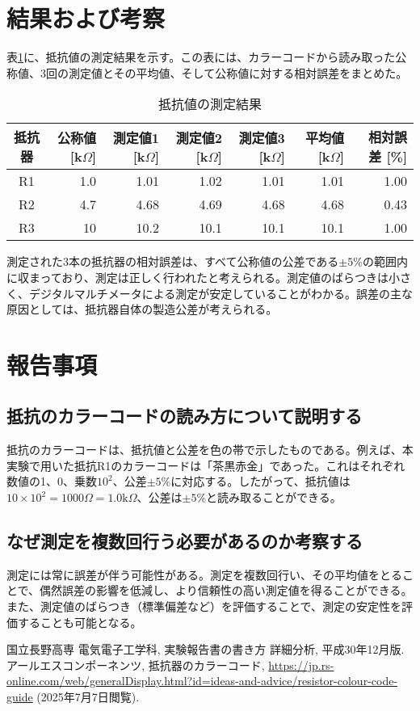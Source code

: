 \documentclass{ltjarticle}
\begin{document}
\section{結果および考察}
表\ref{tab:results}に、抵抗値の測定結果を示す。この表には、カラーコードから読み取った公称値、3回の測定値とその平均値、そして公称値に対する相対誤差をまとめた。

\begin{table}[h]
    \centering
    \caption{抵抗値の測定結果}
    \label{tab:results}
    \begin{tabular}{crrrrrr}
        \toprule
        抵抗器 & 公称値 [k$\Omega$] & 測定値1 [k$\Omega$] & 測定値2 [k$\Omega$] & 測定値3 [k$\Omega$] & 平均値 [k$\Omega$] & 相対誤差 [\%] \\
        \midrule
        R1 & 1.0 & 1.01 & 1.02 & 1.01 & 1.01 & 1.00 \\
        R2 & 4.7 & 4.68 & 4.69 & 4.68 & 4.68 & 0.43 \\
        R3 & 10 & 10.2 & 10.1 & 10.1 & 10.1 & 1.00 \\
        \bottomrule
    \end{tabular}
\end{table}

測定された3本の抵抗器の相対誤差は、すべて公称値の公差である$\pm 5\%$の範囲内に収まっており、測定は正しく行われたと考えられる。測定値のばらつきは小さく、デジタルマルチメータによる測定が安定していることがわかる。誤差の主な原因としては、抵抗器自体の製造公差が考えられる。

\section{報告事項}
\subsection{抵抗のカラーコードの読み方について説明する}
抵抗のカラーコードは、抵抗値と公差を色の帯で示したものである。例えば、本実験で用いた抵抗R1のカラーコードは「茶黒赤金」であった。これはそれぞれ数値の1、0、乗数$10^2$、公差$\pm 5\%$に対応する。したがって、抵抗値は $10 \times 10^2 = 1000\Omega = 1.0\text{k}\Omega$、公差は$\pm 5\%$と読み取ることができる。

\subsection{なぜ測定を複数回行う必要があるのか考察する}
測定には常に誤差が伴う可能性がある。測定を複数回行い、その平均値をとることで、偶然誤差の影響を低減し、より信頼性の高い測定値を得ることができる。また、測定値のばらつき（標準偏差など）を評価することで、測定の安定性を評価することも可能となる。

\begin{thebibliography}{9}
     国立長野高専 電気電子工学科, 実験報告書の書き方 詳細分析, 平成30年12月版.
     アールエスコンポーネンツ, 抵抗器のカラーコード, \url{https://jp.rs-online.com/web/generalDisplay.html?id=ideas-and-advice/resistor-colour-code-guide} (2025年7月7日閲覧).
\end{thebibliography}
\end{document}
